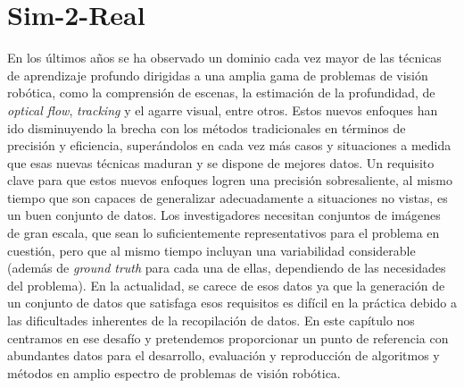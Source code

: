 \chapter{Sim-2-Real}

En los últimos años se ha observado un dominio cada vez mayor de las técnicas de aprendizaje profundo dirigidas a una amplia gama de problemas de visión robótica, como la comprensión de escenas, la estimación de la profundidad, de \emph{optical flow}, \emph{tracking} y el agarre visual, entre otros. Estos nuevos enfoques han ido disminuyendo la brecha con los métodos tradicionales en términos de precisión y eficiencia, superándolos en cada vez más casos y situaciones a medida que esas nuevas técnicas maduran y se dispone de mejores datos. Un requisito clave para que estos nuevos enfoques logren una precisión sobresaliente, al mismo tiempo que son capaces de generalizar adecuadamente a situaciones no vistas, es un buen conjunto de datos. Los investigadores necesitan conjuntos de imágenes de gran escala, que sean lo suficientemente representativos para el problema en cuestión, pero que al mismo tiempo incluyan una variabilidad considerable (además de \emph{ground truth} para cada una de ellas, dependiendo de las necesidades del problema). En la actualidad, se carece de esos datos ya que la generación de un conjunto de datos que satisfaga esos requisitos es difícil en la práctica debido a las dificultades inherentes de la recopilación de datos. En este capítulo nos centramos en ese desafío y pretendemos proporcionar un punto de referencia con abundantes datos para el desarrollo, evaluación y reproducción de algoritmos y métodos en amplio espectro de problemas de visión robótica.

